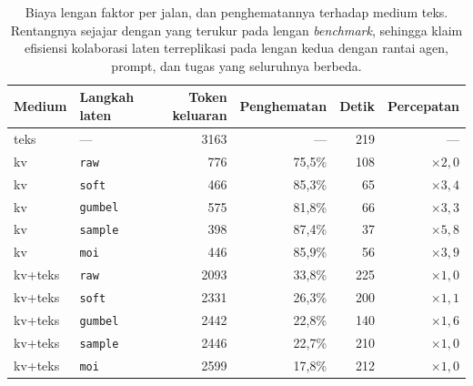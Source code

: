 \begin{table}[htbp]
\centering
\caption{Biaya lengan faktor per jalan, dan penghematannya terhadap medium teks. Rentangnya sejajar dengan yang terukur pada lengan \textit{benchmark}, sehingga klaim efisiensi kolaborasi laten terreplikasi pada lengan kedua dengan rantai agen, prompt, dan tugas yang seluruhnya berbeda.}
\label{tab:faktor-efisiensi}
\small
\begin{tabular}{llrrrr}
\hline
Medium & Langkah laten & Token keluaran & Penghematan & Detik & Percepatan \\
\hline
teks & --- & 3163 & --- & 219 & --- \\
\hline
kv & \texttt{raw} & 776 & 75,5\% & 108 & $\times2,0$ \\
kv & \texttt{soft} & 466 & 85,3\% & 65 & $\times3,4$ \\
kv & \texttt{gumbel} & 575 & 81,8\% & 66 & $\times3,3$ \\
kv & \texttt{sample} & 398 & 87,4\% & 37 & $\times5,8$ \\
kv & \texttt{moi} & 446 & 85,9\% & 56 & $\times3,9$ \\
\hline
kv+teks & \texttt{raw} & 2093 & 33,8\% & 225 & $\times1,0$ \\
kv+teks & \texttt{soft} & 2331 & 26,3\% & 200 & $\times1,1$ \\
kv+teks & \texttt{gumbel} & 2442 & 22,8\% & 140 & $\times1,6$ \\
kv+teks & \texttt{sample} & 2446 & 22,7\% & 210 & $\times1,0$ \\
kv+teks & \texttt{moi} & 2599 & 17,8\% & 212 & $\times1,0$ \\
\hline
\end{tabular}
\end{table}
